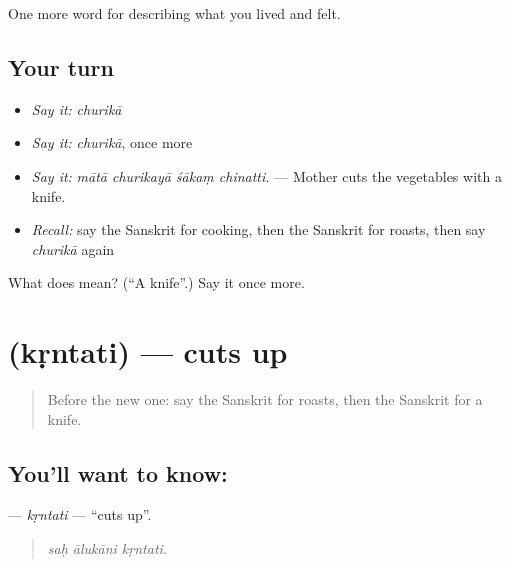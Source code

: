 \begin{grammarlens}[title={What you've built}]
One more word for describing what you lived and felt.
\end{grammarlens}

\subsection*{Your turn}
\begin{itemize}
\raggedright
  \item \emph{Say it:} \emph{churikā}
  \item \emph{Say it:} \emph{churikā}, once more
  \item \emph{Say it:} \emph{mātā churikayā śākaṃ chinatti.} — Mother cuts the vegetables with a knife.
  \item \emph{Recall:} say the Sanskrit for cooking, then the Sanskrit for roasts, then say \emph{churikā} again
\end{itemize}

\begin{tcolorbox}[breakable,colback=teal!4,colframe=teal!35!black,title={Before you move on}]
What does  mean? (\textquotedblleft{}A knife\textquotedblright{}.) Say it once more.
\end{tcolorbox}
\section[\texorpdfstring{\sk{कृन्तति} (kṛntati)}{कृन्तति (kṛntati)}]{ (kṛntati) — cuts up}

\label{lesson:SA-C512-krntati}



\begin{quote}
Before the new one: say the Sanskrit for roasts, then the Sanskrit for a knife.
\end{quote}

\subsection*{You'll want to know: }
\textbf{} — \emph{kṛntati} — \textquotedblleft{}cuts up\textquotedblright{}.

\begin{quote}
  
\end{quote}

\begin{quote}
\emph{saḥ ālukāni kṛntati.}
\end{quote}


